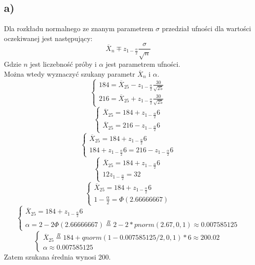 \documentclass{article}
\begin{document}
\subsection{a)}
Dla rozkładu normalnego ze znanym parametrem $\sigma$ przedział ufności dla wartości oczekiwanej jest następujący:
\[ \overline{X}_n \mp z_{1-\frac{\alpha}{2}} \frac{\sigma}{\sqrt{n}} \]
Gdzie $n$ jest liczebność próby i $\alpha$ jest parametrem ufności. \\
Można wtedy wyznaczyć szukany parametr $\overline{X}_n$ i $\alpha$.
\[
\left\{ \begin{array}{c} 184 = \overline{X}_{25} - z_{1-\frac{\alpha}{2}} \frac{30}{\sqrt{25}} \\ 
216 = \overline{X}_{25} + z_{1-\frac{\alpha}{2}} \frac{30}{\sqrt{25}} \end{array} \right. \]
\[
\left\{ \begin{array}{c} \overline{X}_{25} = 184  + z_{1-\frac{\alpha}{2}} 6 \\ 
\overline{X}_{25} = 216 - z_{1-\frac{\alpha}{2}} 6 \end{array} \right. \]
\[
\left\{ \begin{array}{c} \overline{X}_{25} = 184  + z_{1-\frac{\alpha}{2}} 6 \\ 
 184  + z_{1-\frac{\alpha}{2}} 6 = 216 - z_{1-\frac{\alpha}{2}} 6 \end{array} \right. \]
\[
\left\{ \begin{array}{c} \overline{X}_{25} = 184  + z_{1-\frac{\alpha}{2}} 6 \\ 
 12 z_{1-\frac{\alpha}{2}} = 32 \end{array} \right. \]
\[
\left\{ \begin{array}{c} \overline{X}_{25} = 184  + z_{1-\frac{\alpha}{2}} 6 \\ 
 1-\frac{\alpha}{2} = \Phi(2.66666667) \end{array} \right. \]
\[
\left\{ \begin{array}{c} \overline{X}_{25} = 184  + z_{1-\frac{\alpha}{2}} 6 \\ 
\alpha = 2-2\Phi(2.66666667) \overset{R}{=} 2 - 2*pnorm(2.67, 0, 1) \approx 0.007585125\end{array} \right. \]
\[
\left\{ \begin{array}{c} \overline{X}_{25} \overset{R}{=} 184  + qnorm(1 - 0.007585125/2, 0 ,1)*6 \approx 200.02 \\ 
\alpha \approx 0.007585125\end{array} \right. \]
Zatem szukana średnia wynosi 200.
\end{document}
